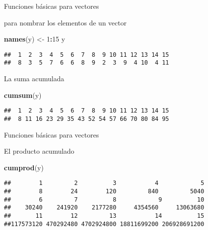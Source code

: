 \documentclass[ignorenonframetext,]{beamer}
\newenvironment{Shaded}{\begin{snugshade}}{\end{snugshade}}
\newcommand{\KeywordTok}[1]{\textcolor[rgb]{0.13,0.29,0.53}{\textbf{#1}}}
\newcommand{\DecValTok}[1]{\textcolor[rgb]{0.00,0.00,0.81}{#1}}
\newcommand{\StringTok}[1]{\textcolor[rgb]{0.31,0.60,0.02}{#1}}
\newcommand{\OperatorTok}[1]{\textcolor[rgb]{0.81,0.36,0.00}{\textbf{#1}}}
\newcommand{\NormalTok}[1]{#1}
\begin{document}
\begin{frame}[fragile]{Funciones básicas para vectores}

para nombrar los elementos de un vector

\begin{Shaded}
\begin{Highlighting}[]
\KeywordTok{names}\NormalTok{(y) <-}\StringTok{ }\DecValTok{1}\OperatorTok{:}\DecValTok{15}
\NormalTok{y}
\end{Highlighting}
\end{Shaded}

\begin{verbatim}
##  1  2  3  4  5  6  7  8  9 10 11 12 13 14 15 
##  8  3  5  7  6  6  8  9  2  3  9  4 10  4 11
\end{verbatim}

La suma acumulada

\begin{Shaded}
\begin{Highlighting}[]
\KeywordTok{cumsum}\NormalTok{(y)}
\end{Highlighting}
\end{Shaded}

\begin{verbatim}
##  1  2  3  4  5  6  7  8  9 10 11 12 13 14 15 
##  8 11 16 23 29 35 43 52 54 57 66 70 80 84 95
\end{verbatim}

\end{frame}

\begin{frame}[fragile]{Funciones básicas para vectores}

El producto acumulado

\begin{Shaded}
\begin{Highlighting}[]
\KeywordTok{cumprod}\NormalTok{(y)}
\end{Highlighting}
\end{Shaded}

\begin{verbatim}
##        1         2          3           4            5 
##        8        24        120         840         5040 
##        6         7          8            9          10 
##    30240    241920    2177280     4354560     13063680 
##       11        12         13           14          15 
##117573120 470292480 4702924800 18811699200 206928691200
\end{verbatim}

\end{frame}
\end{document}
